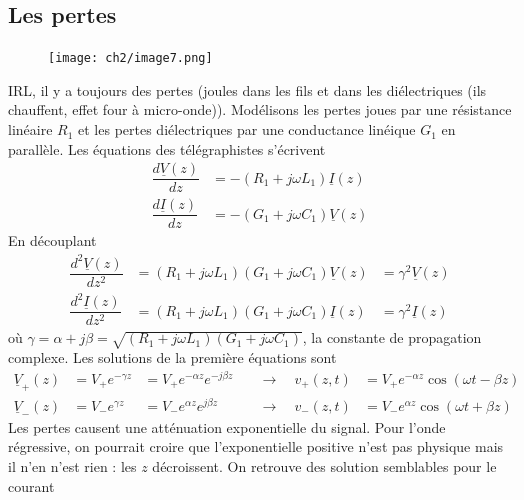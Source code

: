 	\subsection{Les pertes}
	\begin{figure}
	\vspace{-7mm}
	\texttt{[image: ch2/image7.png]}
	\end{figure}
	IRL, il y a toujours des pertes (joules dans les fils et dans les diélectriques 
	(ils chauffent, effet four à micro-onde)). 
	Modélisons les pertes joues par une résistance linéaire $R_1$ et les pertes 
	diélectriques par une conductance linéique $G_1$ en parallèle. Les équations des 
	télégraphistes s'écrivent
	\begin{equation}
	\begin{split}
	\dfrac{d\underline{V}(z)}{dz} &= -(R_1+j\omega L_1)\underline{I}(z)\\
	\dfrac{d\underline{I}(z)}{dz} &= -(G_1+j\omega C_1)\underline{V}(z)	
	\end{split}
	\end{equation}
	En découplant
	\begin{equation}
	\begin{aligned}
	\dfrac{d^2\underline{V}(z)}{dz^2} &= (R_1+j\omega L_1)(G_1+j\omega C_1)\underline{V}(z)
	&= \gamma^2\underline{V}(z)\\
	\dfrac{d^2\underline{I}(z)}{dz^2} &= (R_1+j\omega L_1)(G_1+j\omega C_1)\underline{I}(z)
	&= \gamma^2\underline{I}(z)	
	\end{aligned}
	\end{equation}
	où $\gamma = \alpha+j\beta= \sqrt{(R_1+j\omega L_1)(G_1+j\omega C_1)}$, la constante de 
	propagation complexe. Les solutions de la première équations sont
	\begin{equation}
	\begin{array}{lllll}
	\underline{V}_+(z) &= V_+e^{-\gamma z} &= V_+e^{-\alpha z}e^{-j\beta z} \quad &\rightarrow
	\quad v_+(z,t) &= 	V_+e^{-\alpha z}\cos(\omega t-\beta z)\\
	\underline{V}_-(z) &= V_-e^{\gamma z} &= V_-e^{\alpha z}e^{j\beta z}  \quad &\rightarrow
	\quad v_-(z,t) &= 	V_-e^{\alpha z}\cos(\omega t+\beta z)	
	\end{array}
	\end{equation}
	Les pertes causent une atténuation exponentielle du signal. Pour l'onde régressive, on 
	pourrait croire que l'exponentielle positive n'est pas physique mais il n'en n'est rien : 
	les $z$ décroissent. On retrouve des solution semblables pour le courant
